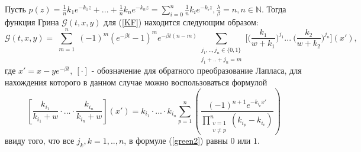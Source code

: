 \begin{theorem}
 Пусть $p(z)=\frac{1}{n} k_1 e^{-k_1 z} +...
 +\frac{1}{n} k_n e^{-k_n z}=
 \sum\limits_{i=0}^{n}\frac{1}{n} k_i e^{-k_i z},
 \frac{\lambda}{\beta} = n, n \in \mathbb{N}.$
 Тогда функция Грина $\mathcal{G}(t,x,y)$ для (\ref{KF}) находится следующим образом:
\begin{equation} \label{green2}
    \mathcal{G}(t,x,y) = \sum\limits_{\substack{m=1}}^{n} 
(-1)^m (e^{-\beta t}-1)^m e^{-\beta t (n-m)}
\sum\limits_{\substack{j_1,..,j_n \in \{ 0,1 \}\\
j_1+..+j_n=m}}^{} 
\Big[\Big(\frac{k_1}{w+k_1}\Big)^{j_1} ...  \ \Big(\frac{k_2}{w+k_2}\Big)^{j_n} \Big](x'),
\end{equation}
где $x'=x-y e^{-\beta t},\ [\cdot]$ - обозначение для обратного преобразование Лапласа, для нахождения которого в данном случае можно воспользоваться формулой
\begin{equation} \label{inv2}
    \left[   \frac{k_{i_1}}{k_{i_1}+w}\cdot...
    \cdot \frac{k_{i_n}}{k_{i_n}+w}
    \right](x')=
    k_{i_1}\cdot...\cdot k_{i_n}
    \sum\limits_{p=1}^{n} \left(
    \frac{(-1)^{n+1}e^{-k_{i_p}x'}}
    {\prod\limits_{\substack{v=1\\v\ne p}}^{n}
    (k_{i_p}-k_{i_v})} \right)
\end{equation} 
ввиду того, что все $j_k, k=1,..,n$, в формуле (\ref{green2}) равны $0$ или $1$.
\end{theorem}





%



